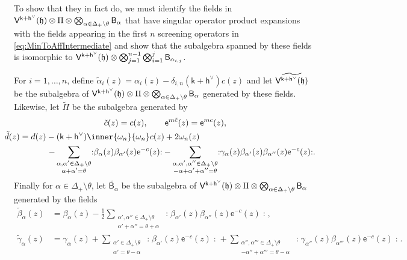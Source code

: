 \documentclass[10pt,a4paper]{amsart}
\numberwithin{equation}{section}
\newcommand{\ee}{\mathsf{e}}   %
\newcommand{\kk}{\mathsf{k}}   %
\DeclarePairedDelimiter{\brac}{\lparen}{\rparen}   %
\newcommand{\no}[1]{\mathopen{:} #1 \mathclose{:}} %
\newcommand{\VOA}[1]{\mathsf{#1}}    %
\newcommand{\cartan}{\mathfrak{h}}
\newcommand{\cox}{\mathsf{h}}                                        %
\newcommand{\dcox}{\coroot{\cox}}                                    %
\newcommand{\proots}{\Delta_+}                                       %
\newcommand{\sroot}[1]{\alpha_{#1}}                                  %
\newcommand{\tsroot}[1]{\tilde{\alpha}_{#1}}                         %
\newcommand{\hroot}{\theta}                                          %
\newcommand{\fwt}[1]{\omega_{#1}}                                    %
\newcommand{\coroot}[1]{#1^{\vee}}                                   %
\newcommand{\uaffvoa}[2]{\VOA{V}^{#1}\brac{#2}}                   %
\newcommand{\bgvoa}{\VOA{B}}                                      %
\theoremstyle{plain}
\begin{document}
To show that they in fact do,  we must identify the fields in $\uaffvoa{\kk+\dcox}{\cartan} \otimes \Pi \otimes \bigotimes_{\alpha \in \proots \setminus \hroot} \bgvoa_\alpha$ that have singular operator product expansions with the fields appearing in the first $n$ screening operators in \eqref{eq:MinToAffIntermediate} and show that the subalgebra spanned by these fields is isomorphic to $\uaffvoa{\kk+\dcox}{\cartan} \otimes \bigotimes_{j=1}^{n-1}\bigotimes_{i=1}^{j} \bgvoa_{\sroot{i,j}}$.

For $i=1,\dots, n$, define $\tsroot{i}(z) = \sroot{i}(z)-\delta_{i,n}(\kk+\dcox)c(z)$ and let $\widetilde{\uaffvoa{\kk+\dcox}{\cartan}}$ be the subalgebra of $\uaffvoa{\kk+\dcox}{\cartan} \otimes \Pi \otimes \bigotimes_{\alpha \in \proots \setminus \hroot} \bgvoa_\alpha$ generated by these fields. Likewise, let $\widetilde{\Pi}$ be the subalgebra generated by
%
\begin{equation} \label{eq:tildeHalfLat}
\begin{gathered}
    \tilde{c}(z) = c(z), \qquad 
    \ee^{m\tilde{c}}(z) = \ee^{mc}(z), \\
    \hspace{-15em} \tilde{d}(z) = d(z) 
    - (\kk+\dcox)\inner{\fwt{n}}{\fwt{n}} c(z)
    + 2 \fwt{n}(z) \\
    \hspace{4em}- \sum_{\substack{\alpha,\alpha' \in \proots \setminus \hroot \\ \alpha+\alpha'=\hroot}} \no{\beta_\alpha (z) \beta_{\alpha'}(z)\ee^{-c}(z)} 
    - \sum_{\substack{\alpha,\alpha',\alpha'' \in \proots \setminus \hroot \\ -\alpha+\alpha'+\alpha''=\hroot}} \no{\gamma_\alpha(z) \beta_{\alpha'} (z) \beta_{\alpha''}(z)\ee^{-c}(z)}.
\end{gathered}
\end{equation}
%
Finally for $\alpha \in \proots \setminus \hroot$, let $\widetilde{\bgvoa_\alpha}$ be the subalgebra of $\uaffvoa{\kk+\dcox}{\cartan} \otimes \Pi \otimes \bigotimes_{\alpha \in \proots \setminus \hroot} \bgvoa_\alpha$ generated by the fields
%
\begin{equation} \label{eq:tildeGhosts}
\begin{aligned}
    \tilde{\beta}_\alpha(z) &= \beta_\alpha(z)
    - \frac{1}{2}\sum_{\substack{\alpha',\alpha'' \in \proots \setminus \hroot \\ \alpha'+\alpha''=\hroot+\alpha}} \no{\beta_{\alpha'} (z) \beta_{\alpha''}(z)\ee^{-c}(z)}, \\
    \tilde{\gamma}_\alpha(z) &= \gamma_\alpha(z) 
    + \sum_{\substack{\alpha' \in \proots \setminus \hroot \\ \alpha'=\hroot-\alpha}}\no{\beta_{\alpha'}(z)\ee^{-c}(z)}
    + \sum_{\substack{\alpha'',\alpha''' \in \proots \setminus \hroot \\ -\alpha''+\alpha'''=\hroot-\alpha}}\no{\gamma_{\alpha''}(z)\beta_{\alpha'''}(z)\ee^{-c}(z)}.
\end{aligned}
\end{equation}
\end{document}
